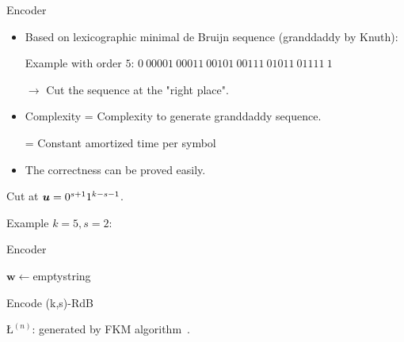 \begin{frame}{Encoder}
    \begin{itemize}
        \item Based on lexicographic minimal de Bruijn sequence (granddaddy by Knuth):
        
        Example with order $5$: $0\ 00001\ 00011\ 00101\ 00111\ 01011\ 01111\ 1$
        
        $\rightarrow$ Cut the sequence at the "right place".
        \item Complexity = Complexity to generate granddaddy sequence.
        
        \hspace{1.8cm} = Constant amortized time per symbol~
        \item The correctness can be proved easily.
    \end{itemize}
    \pause
    Cut at ${\boldsymbol u} = 0^{s+1}1^{k-s-1}$.
    
    \pause
    Example $k=5,s=2:$

    
    
\end{frame}

\begin{frame}{Encoder}
    \begin{algorithm}[H]
    \DontPrintSemicolon
        \BlankLine
        
        $\mathbf{w}\gets$emptystring\;
        \caption{Encode (k,s)-RdB}
        \label{alg:encoder}
    \end{algorithm}
    $\text{\L}^{(n)}$: generated by FKM algorithm~.
\end{frame}

